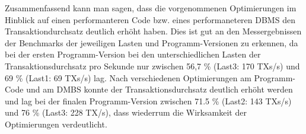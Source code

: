 Zusammenfassend kann man sagen, dass die vorgenommenen Optimierungen im Hinblick auf einen performanteren Code bzw. eines performaneteren DBMS den Transaktiondurchsatz deutlich erhöht haben.
Dies ist gut an den Messergebnissen der Benchmarks der jeweiligen Lasten und Programm-Versionen zu erkennen, da bei der ersten Programm-Version bei den unterschiedlichen Lasten der Transaktionsdurchsatz pro Sekunde nur zwischen 56,7 \% (Last3: 170 TXs/s) und 69 \% (Last1: 69 TXs/s) lag.
Nach verschiedenen Optimierungen am Programm-Code und am DMBS konnte der Transaktionsdurchsatz deutlich erhöht werden und lag bei der finalen Programm-Version zwischen 71.5 \% (Last2: 143 TXs/s) und 76 \% (Last3: 228 TX/s), dass wiederrum die Wirksamkeit der Optimierungen verdeutlicht.
